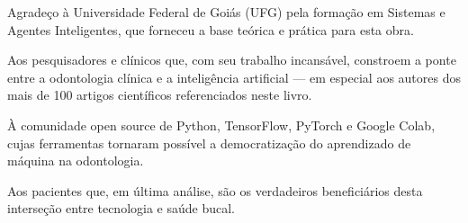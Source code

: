 
\begin{agradecimentos}

Agradeço à Universidade Federal de Goiás (UFG) pela formação em Sistemas e Agentes Inteligentes, que forneceu a base teórica e prática para esta obra.

Aos pesquisadores e clínicos que, com seu trabalho incansável, constroem a ponte entre a odontologia clínica e a inteligência artificial — em especial aos autores dos mais de 100 artigos científicos referenciados neste livro.

À comunidade open source de Python, TensorFlow, PyTorch e Google Colab, cujas ferramentas tornaram possível a democratização do aprendizado de máquina na odontologia.

Aos pacientes que, em última análise, são os verdadeiros beneficiários desta interseção entre tecnologia e saúde bucal.

\end{agradecimentos}
